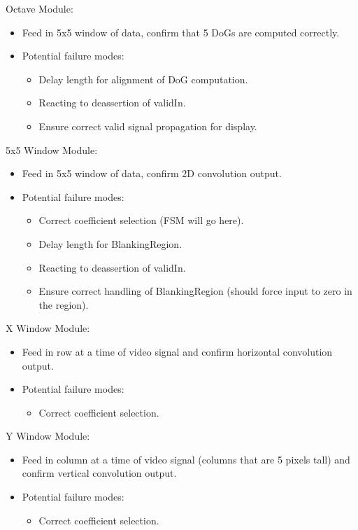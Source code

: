 \documentclass[11pt]{article}
\begin{document}
\noindent Octave Module:
\begin{itemize}
    \item Feed in 5x5 window of data, confirm that 5 DoGs are computed correctly.
    \item Potential failure modes:
        \begin{itemize}
            \item Delay length for alignment of DoG computation.
            \item Reacting to deassertion of validIn.
            \item Ensure correct valid signal propagation for display.
        \end{itemize}
\end{itemize}


\noindent 5x5 Window Module:
\begin{itemize}
    \item Feed in 5x5 window of data, confirm 2D convolution output.
    \item Potential failure modes:
        \begin{itemize}
            \item Correct coefficient selection (FSM will go here).
            \item Delay length for BlankingRegion.
            \item Reacting to deassertion of validIn.
            \item Ensure correct handling of BlankingRegion (should force input to zero in the region).
        \end{itemize}
\end{itemize}


\noindent X Window Module:
\begin{itemize}
    \item Feed in row at a time of video signal and confirm horizontal convolution output.
    \item Potential failure modes:
        \begin{itemize}
            \item Correct coefficient selection.
        \end{itemize}
\end{itemize}


\noindent Y Window Module:
\begin{itemize}
    \item Feed in column at a time of video signal (columns that are 5 pixels tall) and confirm vertical convolution output.
    \item Potential failure modes:
        \begin{itemize}
            \item Correct coefficient selection.
        \end{itemize}
\end{itemize}
\end{document}
